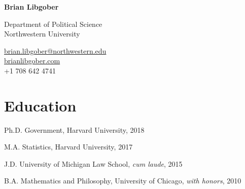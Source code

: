 \documentclass[12pt,letterpaper]{report}
\newcommand{\myname}{Brian Libgober}
\newcommand{\namefont}[1]{{\normalfont\bfseries\Huge{#1}}}
\begin{document}
	\pagestyle{fancy}
	\fancyhf{}
    \fancyfoot[C]{\thepage}  %
    \renewcommand{\footrulewidth}{0pt}  %
	\renewcommand{\headrulewidth}{0pt}
    \raggedright{}

    \begin{minipage}[t]{0.6\textwidth}
	\raggedright{}
    \namefont{\myname}
	\end{minipage}
	\hfill
    \vspace{1em}
    \begin{minipage}[t]{0.6\textwidth}
        \flushleft{} Department of Political Science \\
         Northwestern University
    \end{minipage}
    \hfill
    \begin{minipage}[t]{0.395\textwidth}
        \flushright{}
        \href{mailto:brian.libgober@northwestern.edu}{brian.libgober@northwestern.edu} \\
        \href{https://brianlibgober.com}{brianlibgober.com} \\
         +1 708 642 4741 \\
    \end{minipage}

    \section*{Education}

    \begin{tablist}

        \item[Ph.D.] \tab{}Government, Harvard University, 2018 
        \item[M.A.]  \tab{}Statistics, Harvard University, 2017
        \item[J.D.]  \tab{}University of Michigan Law School, \textit{cum laude}, 2015
        \item[B.A.]  \tab{}Mathematics and Philosophy, University of Chicago, \textit{with honors}, 2010

    \end{tablist}
\end{document}
